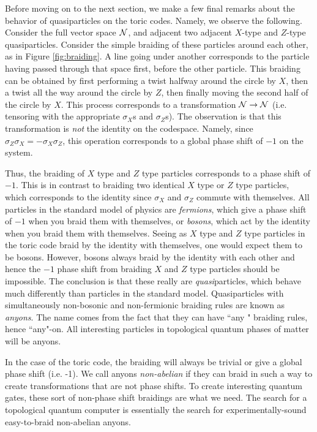\documentclass{article}
\theoremstyle{definition}
\numberwithin{figure}{section}
\begin{document}
Before moving on to the next section, we make a few final remarks about the behavior of quasiparticles on the toric codes. Namely, we observe the following. Consider the full vector space $\mathcal{N}$, and adjacent two adjacent $X$-type and $Z$-type quasiparticles. Consider the simple braiding of these particles around each other, as in Figure \ref{fig:braiding}. A line going under another corresponds to the particle having passed through that space first, before the other particle. This braiding can be obtained by first performing a twist halfway around the circle by $X$, then a twist all the way around the circle by $Z$, then finally moving the second half of the circle by $X$. This process corresponds to a transformation $\mathcal{N}\to \mathcal{N}$ (i.e. tensoring with the appropriate $\sigma_X$s and $\sigma_Z$s). The observation is that this transformation is \textit{not} the identity on the codespace. Namely, since $\sigma_Z\sigma_X=-\sigma_X\sigma_Z$, this operation corresponds to a global phase shift of $-1$ on the system.

Thus, the braiding of $X$ type and $Z$ type particles corresponds to a phase shift of $-1$. This is in contrast to braiding two identical $X$ type or $Z$ type particles, which corresponds to the identity since $\sigma_X$ and $\sigma_Z$ commute with themselves. All particles in the standard model of physics are \textit{fermions}, which give a phase shift of $-1$ when you braid them with themselves, or \textit{bosons}, which act by the identity when you braid them with themselves. Seeing as $X$ type and $Z$ type particles in the toric code braid by the identity with themselves, one would expect them to be bosons. However, bosons always braid by the identity with each other and hence the $-1$ phase shift from braiding $X$ and $Z$ type particles should be impossible. The conclusion is that these really are \textit{quasi}particles, which behave much differently than particles in the standard model. Quasiparticles with simultaneously non-bosonic and non-fermionic braiding rules are known as \textit{anyons}. The name comes from the fact that they can have ``any " braiding rules, hence ``any"-on.  All interesting particles in topological quantum phases of matter will be anyons.

In the case of the toric code, the braiding will always be trivial or give a global phase shift (i.e. -1). We call anyons \textit{non-abelian} if they can braid in such a way to create transformations that are not phase shifts. To  create interesting quantum gates, these sort of non-phase shift braidings are what we need. The search for a topological quantum computer is essentially the search for experimentally-sound easy-to-braid non-abelian anyons.
\end{document}
